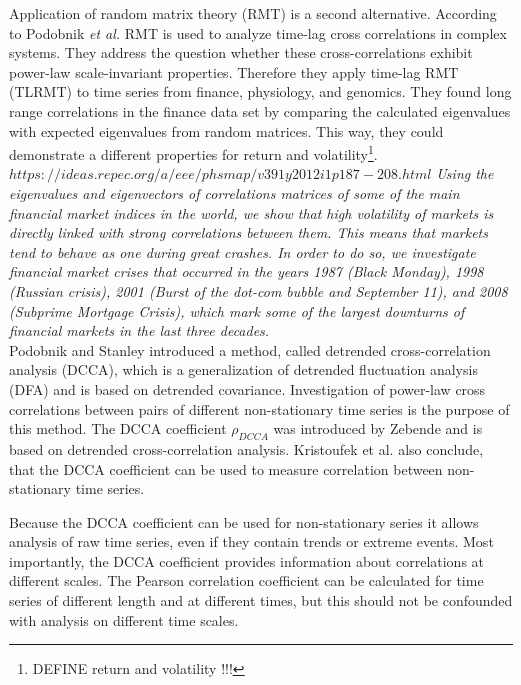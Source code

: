 \documentclass[a4paper,10pt]{scrbook}
\begin{document}
Application of random matrix theory (RMT) is a second alternative. According to Podobnik \textit{et al.} \cite{Podobnik2010} RMT is used to analyze time-lag cross correlations in complex systems. They address the question whether these cross-correlations exhibit power-law scale-invariant properties. Therefore they apply time-lag RMT (TLRMT) to time series from finance, physiology, and genomics. They found long range correlations in the finance data set by comparing the calculated eigenvalues with expected eigenvalues from random matrices. This way, they could demonstrate a different properties for return and volatility\footnote{DEFINE return and volatility !!!}.\\

$https://ideas.repec.org/a/eee/phsmap/v391y2012i1p187-208.html$
\cite{Leonidas2012}
\textit{Using the eigenvalues and eigenvectors of correlations matrices of some of the main financial market indices in the world, we show that high volatility of markets is directly linked with strong correlations between them. This means that markets tend to behave as one during great crashes. In order to do so, we investigate financial market crises that occurred in the years 1987 (Black Monday), 1998 (Russian crisis), 2001 (Burst of the dot-com bubble and September 11), and 2008 (Subprime Mortgage Crisis), which mark some of the largest downturns of financial markets in the last three decades.}\\

  
Podobnik and Stanley \cite{Podobnik2008} introduced a method, called detrended cross-correlation analysis (DCCA), which is a generalization of detrended fluctuation analysis (DFA) and is based on detrended covariance. Investigation of power-law cross correlations between pairs of different non-stationary time series is the purpose of this method. The DCCA coefficient 
$\rho_{DCCA}$ was introduced by Zebende \cite{Zebende2013} and is based on detrended cross-correlation analysis. Kristoufek et al. \cite{Kristoufek2014} also conclude, that the DCCA coefficient can be used to measure correlation between non-stationary time series.




Because the DCCA coefficient can be used for non-stationary series it allows analysis of raw time series, even if they contain trends or extreme events. Most importantly, the DCCA  coefficient provides information about correlations at different scales. The Pearson correlation coefficient can be calculated for time series of different length and at different times, but this should not be confounded with analysis on different time scales. 
\end{document}
